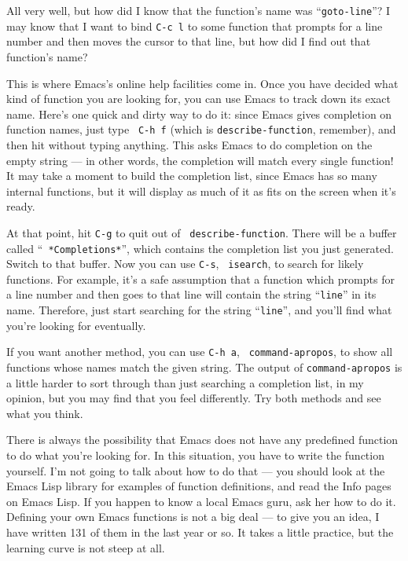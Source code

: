         All very well, but how did I know that the function's name was
``{\tt goto-line}''?  I may know that I want to bind {\tt C-c~l} to
some function that prompts for a line number and then moves the cursor
to that line, but how did I find out that function's name?

        This is where Emacs's online help facilities come in.  Once you
have decided what kind of function you are looking for, you can use
Emacs to track down its exact name.  Here's one quick and dirty way to
do it: since Emacs gives completion on function names, just type {\tt
C-h~f} (which is {\tt describe-function}, remember), and then hit
 without typing anything.  This asks Emacs to do completion
on the empty string --- in other words, the completion will match
every single function!  It may take a moment to build the completion
list, since Emacs has so many internal functions, but it will display
as much of it as fits on the screen when it's ready.

        At that point, hit {\tt C-g} to quit out of {\tt
describe-function}.  There will be a buffer called ``{\tt
*Completions*}'', which contains the completion list you just
generated.  Switch to that buffer.  Now you can use {\tt C-s}, {\tt
isearch}, to search for likely functions.  For example, it's a safe
assumption that a function which prompts for a line number and then
goes to that line will contain the string ``{\tt line}'' in its name.
Therefore, just start searching for the string ``{\tt line}'', and
you'll find what you're looking for eventually.

        If you want another method, you can use {\tt C-h~a}, {\tt
command-apropos}, to show all functions whose names match the given
string.  The output of {\tt command-apropos} is a little harder to
sort through than just searching a completion list, in my opinion, but
you may find that you feel differently.  Try both methods and see what
you think.

        There is always the possibility that Emacs does not have any
predefined function to do what you're looking for.  In this situation,
you have to write the function yourself.  I'm not going to talk about
how to do that --- you should look at the Emacs Lisp library for
examples of function definitions, and read the Info pages on Emacs
Lisp.  If you happen to know a local Emacs guru, ask her how to do it.
Defining your own Emacs functions is not a big deal --- to give you an
idea, I have written 131 of them in the last year or so.  It takes a
little practice, but the learning curve is not steep at all.

